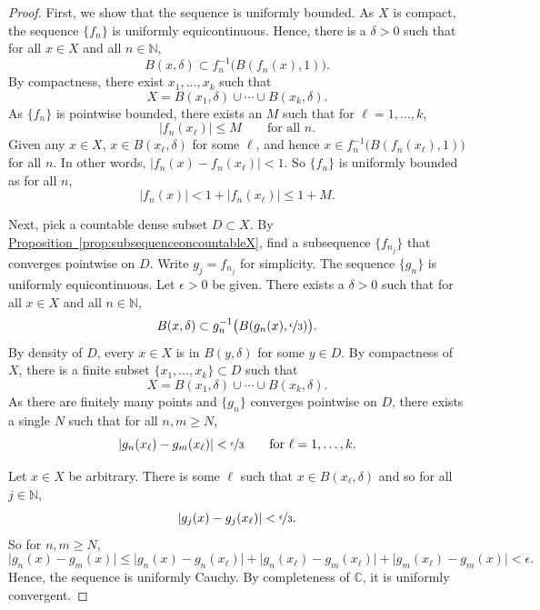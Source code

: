 \documentclass[12pt,openany]{book}
\newcommand{\sabs}[1]{\lvert {#1} \rvert}
\newcommand{\C}{{\mathbb{C}}}
\newcommand{\N}{{\mathbb{N}}}
\theoremstyle{plain}
\theoremstyle{remark}
\theoremstyle{definition}
\theoremstyle{exercise}
\theoremstyle{example}
\newcommand{\propref}[1]{\hyperref[#1]{Proposition~\ref*{#1}}}
\begin{document}
\begin{proof}
First, we show that the sequence is uniformly bounded.
As $X$ is compact, the sequence $\{ f_n \}$ is uniformly
equicontinuous.
Hence,
there is a $\delta > 0$
such that
for all $x \in X$ and all $n \in \N$,
\begin{equation*}
B(x,\delta) \subset f_n^{-1}\bigl(B(f_n(x),1)\bigr) .
\end{equation*}
By compactness,
there exist $x_1,\ldots,x_k$ such that
\begin{equation*}
X = 
B(x_1,\delta)
\cup \cdots \cup
B(x_k,\delta) .
\end{equation*}
As $\{ f_n \}$ is pointwise bounded, there exists an $M$
such that for $\ell=1,\ldots,k$,
\begin{equation*}
\sabs{f_n(x_\ell)} \leq M \qquad \text{for all } n.
\end{equation*}
Given any
$x \in X$, $x \in B(x_\ell,\delta)$ for some $\ell$, and
hence
$x \in f_n^{-1}\bigl(B(f_n(x_\ell),1)\bigr)$
for all $n$.
In other words,
$\sabs{f_n(x)-f_n(x_\ell)} < 1$.  So $\{ f_n \}$ is uniformly bounded as
for all $n$,
\begin{equation*}
\sabs{f_n(x)} < 1+ \sabs{f_n(x_\ell)} \leq 1+M .
\end{equation*}

Next, pick a countable dense subset $D \subset X$.
By \propref{prop:subsequenceoncountableX}, find
a subsequence $\{ f_{n_j} \}$ that converges pointwise on $D$.
Write $g_j = f_{n_j}$ for simplicity.
The sequence $\{ g_n \}$ is 
uniformly equicontinuous.
Let $\epsilon > 0$ be given.  There exists a $\delta > 0$
such that for all $x \in X$ and all $n \in \N$,
\begin{equation*}
B(x,\delta) \subset g_n^{-1}\bigl(B(g_n(x),\nicefrac{\epsilon}{3})\bigr).
\end{equation*}
By density of $D$, every $x \in X$ is in $B(y,\delta)$
for some $y \in D$.  By compactness of $X$,
there is a finite subset $\{ x_1,\ldots,x_k \} \subset D$
such that
\begin{equation*}
X = 
B(x_1,\delta)
\cup \cdots \cup
B(x_k,\delta) .
\end{equation*}
As there are finitely many points and $\{ g_n \}$
converges pointwise on $D$, there exists a single $N$ such that for 
all $n,m \geq N$,
\begin{equation*}
\sabs{g_n(x_\ell)-g_m(x_\ell)} < \nicefrac{\epsilon}{3}
 \qquad \text{for } \ell=1,\ldots,k.
\end{equation*}

Let $x \in X$ be arbitrary.  There is some $\ell$ such that
$x \in B(x_\ell,\delta)$ and so for all $j \in \N$,
\begin{equation*}
\sabs{g_j(x)-g_j(x_\ell)} < \nicefrac{\epsilon}{3}.
\end{equation*}
So for $n,m \geq N$,
\begin{equation*}
\sabs{g_n(x)-g_m(x)} \leq
\sabs{g_n(x)-g_n(x_\ell)} +
\sabs{g_n(x_\ell)-g_m(x_\ell)} +
\sabs{g_m(x_\ell)-g_m(x)} <
\epsilon .
\end{equation*}
Hence, the sequence is uniformly Cauchy.  By completeness of $\C$,
it is uniformly convergent.
\end{proof}
\end{document}

